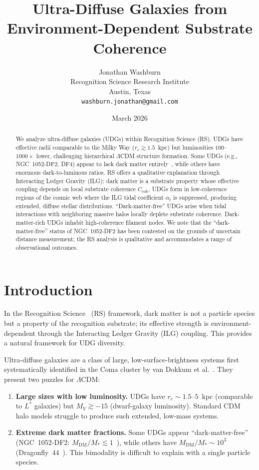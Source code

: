 \documentclass[12pt,a4paper]{article}
\title{Ultra-Diffuse Galaxies from\\
Environment-Dependent Substrate Coherence}
\author{Jonathan Washburn\\
Recognition Science Research Institute\\
Austin, Texas\\
\texttt{washburn.jonathan@gmail.com}}
\date{March 2026}
\theoremstyle{definition}
\theoremstyle{remark}
\begin{document}
\maketitle

\begin{abstract}
We analyze ultra-diffuse galaxies (UDGs) within Recognition Science
(RS).  UDGs have effective radii comparable to the Milky Way
($r_e \gtrsim 1.5$~kpc) but luminosities $100$--$1000\times$ lower,
challenging hierarchical $\Lambda$CDM structure formation.  Some UDGs
(e.g., NGC~1052-DF2, DF4) appear to lack dark matter
entirely~\cite{vanDokkum2018,vanDokkum2019}, while others have
enormous dark-to-luminous ratios.  RS offers a qualitative explanation through Interacting Ledger
Gravity (ILG): dark matter is a substrate property whose effective
coupling depends on local substrate coherence $C_{\mathrm{sub}}$.
UDGs form in low-coherence regions of the cosmic web where the ILG
tidal coefficient $\alpha_t$ is suppressed, producing extended,
diffuse stellar distributions.  ``Dark-matter-free'' UDGs arise when
tidal interactions with neighboring massive halos locally deplete
substrate coherence.  Dark-matter-rich UDGs inhabit high-coherence
filament nodes.  We note that the ``dark-matter-free'' status of
NGC~1052-DF2 has been contested on the grounds of uncertain distance
measurement; the RS analysis is qualitative and accommodates a range
of observational outcomes.
\end{abstract}

\section{Introduction}
\label{sec:intro}

In the Recognition Science~\cite{RS_Axioms} (RS) framework, dark matter is
not a particle species but a property of the recognition substrate;
its effective strength is environment-dependent through the
Interacting Ledger Gravity (ILG) coupling.  This provides a natural
framework for UDG diversity.

Ultra-diffuse galaxies are a class of large, low-surface-brightness
systems first systematically identified in the Coma cluster by van
Dokkum et al.~\cite{vanDokkum2015}.  They present two puzzles for
$\Lambda$CDM:

\begin{enumerate}[nosep]
  \item \textbf{Large sizes with low luminosity.}  UDGs have
  $r_e \sim 1.5$--$5$~kpc (comparable to $L^\ast$ galaxies) but
  $M_V \gtrsim -15$ (dwarf-galaxy luminosity).  Standard CDM halo
  models struggle to produce such extended, low-mass systems.

  \item \textbf{Extreme dark matter fractions.}  Some UDGs appear
  ``dark-matter-free'' (NGC~1052-DF2: $M_{\mathrm{DM}}/M_\ast
  \lesssim 1$~\cite{vanDokkum2018}), while others have
  $M_{\mathrm{DM}}/M_\ast \sim 10^3$ (Dragonfly~44~\cite{vanDokkum2016}).
  This bimodality is difficult to explain with a single particle
  species.
\end{enumerate}
\end{document}
